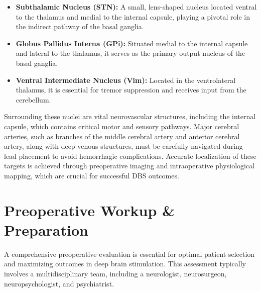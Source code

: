 \begin{itemize}
  \item \textbf{Subthalamic Nucleus (STN):} A small, lens-shaped nucleus located ventral to the thalamus and medial to the internal capsule, playing a pivotal role in the indirect pathway of the basal ganglia.
  \item \textbf{Globus Pallidus Interna (GPi):} Situated medial to the internal capsule and lateral to the thalamus, it serves as the primary output nucleus of the basal ganglia.
  \item \textbf{Ventral Intermediate Nucleus (Vim):} Located in the ventrolateral thalamus, it is essential for tremor suppression and receives input from the cerebellum.
\end{itemize}

Surrounding these nuclei are vital neurovascular structures, including the internal capsule, which contains critical motor and sensory pathways. Major cerebral arteries, such as branches of the middle cerebral artery and anterior cerebral artery, along with deep venous structures, must be carefully navigated during lead placement to avoid hemorrhagic complications. Accurate localization of these targets is achieved through preoperative imaging and intraoperative physiological mapping, which are crucial for successful DBS outcomes.

\section*{Preoperative Workup \& Preparation}
A comprehensive preoperative evaluation is essential for optimal patient selection and maximizing outcomes in deep brain stimulation. This assessment typically involves a multidisciplinary team, including a neurologist, neurosurgeon, neuropsychologist, and psychiatrist.

